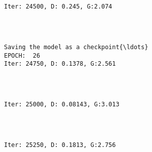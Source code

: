\documentclass[11pt]{article}
\begin{document}
    \begin{center}
    \end{center}
    { \hspace*{\fill} \\}
    
    \begin{Verbatim}[commandchars=\\\{\}]

Iter: 24500, D: 0.245, G:2.074
    \end{Verbatim}

    \begin{center}
    \end{center}
    { \hspace*{\fill} \\}
    
    \begin{Verbatim}[commandchars=\\\{\}]

Saving the model as a checkpoint{\ldots}
EPOCH:  26
Iter: 24750, D: 0.1378, G:2.561
    \end{Verbatim}

    \begin{center}
    \end{center}
    { \hspace*{\fill} \\}
    
    \begin{Verbatim}[commandchars=\\\{\}]

Iter: 25000, D: 0.08143, G:3.013
    \end{Verbatim}

    \begin{center}
    \end{center}
    { \hspace*{\fill} \\}
    
    \begin{Verbatim}[commandchars=\\\{\}]

Iter: 25250, D: 0.1813, G:2.756
    \end{Verbatim}
\end{document}
